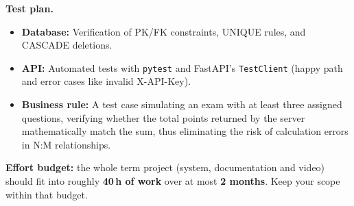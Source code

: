 \documentclass[11pt,a4paper]{article}
\begin{document}
\textbf{Test plan.}
\begin{itemize}[topsep=2pt]
  \item \textbf{Database:} Verification of PK/FK constraints, UNIQUE rules, and CASCADE deletions.
  \item \textbf{API:} Automated tests with \texttt{pytest} and FastAPI's \texttt{TestClient} (happy path and error cases like invalid X-API-Key).
  \item \textbf{Business rule:} A test case simulating an exam with at least three assigned questions, verifying whether the total points returned by the server mathematically match the sum, thus eliminating the risk of calculation errors in N:M relationships.
\end{itemize}

\vspace{1em}
\begin{infobox}
\textbf{Effort budget:} the whole term project (system, documentation and video)
should fit into roughly \textbf{40\,h of work} over at most \textbf{2 months}.
Keep your scope within that budget.
\end{infobox}
\end{document}
